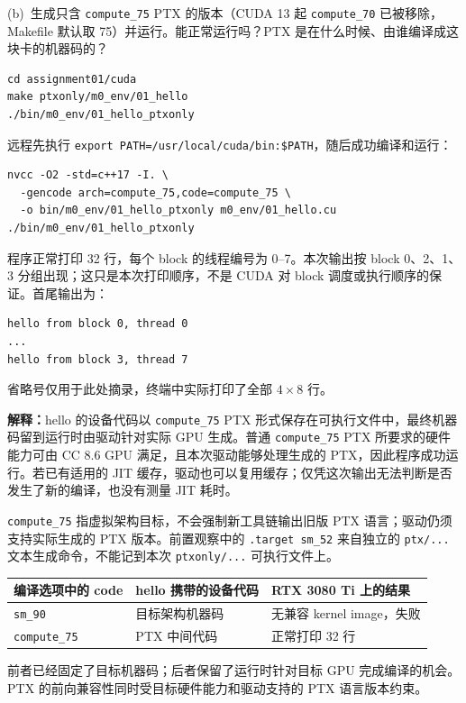 \documentclass[11pt,a4paper,fontset=none]{ctexart}
\begin{document}
(b)~生成只含 \texttt{compute\_75} PTX 的版本（CUDA 13 起 \texttt{compute\_70} 已被移除，Makefile 默认取 75）并运行。能正常运行吗？PTX 是在什么时候、由谁编译成这块卡的机器码的？

\begin{lstlisting}
cd assignment01/cuda
make ptxonly/m0_env/01_hello
./bin/m0_env/01_hello_ptxonly
\end{lstlisting}

\begin{tcolorbox}[title={8.2(b) 实验记录：只含低架构 PTX},breakable]
远程先执行 \texttt{export PATH=/usr/local/cuda/bin:\$PATH}，随后成功编译和运行：
\begin{lstlisting}
nvcc -O2 -std=c++17 -I. \
  -gencode arch=compute_75,code=compute_75 \
  -o bin/m0_env/01_hello_ptxonly m0_env/01_hello.cu
./bin/m0_env/01_hello_ptxonly
\end{lstlisting}
程序正常打印 32 行，每个 block 的线程编号为 0--7。本次输出按 block 0、2、1、3 分组出现；这只是本次打印顺序，不是 CUDA 对 block 调度或执行顺序的保证。首尾输出为：
\begin{lstlisting}
hello from block 0, thread 0
...
hello from block 3, thread 7
\end{lstlisting}
省略号仅用于此处摘录，终端中实际打印了全部 $4\times8$ 行。

\textbf{解释：}hello 的设备代码以 \texttt{compute\_75} PTX 形式保存在可执行文件中，最终机器码留到运行时由驱动针对实际 GPU 生成。普通 \texttt{compute\_75} PTX 所要求的硬件能力可由 CC 8.6 GPU 满足，且本次驱动能够处理生成的 PTX，因此程序成功运行。若已有适用的 JIT 缓存，驱动也可以复用缓存；仅凭这次输出无法判断是否发生了新的编译，也没有测量 JIT 耗时。

\texttt{compute\_75} 指虚拟架构目标，不会强制新工具链输出旧版 PTX 语言；驱动仍须支持实际生成的 PTX 版本。前置观察中的 \texttt{.target sm\_52} 来自独立的 \texttt{ptx/...} 文本生成命令，不能记到本次 \texttt{ptxonly/...} 可执行文件上。
\end{tcolorbox}

\begin{tcolorbox}[title={8.2 两次实验对照},breakable]
\begin{center}\small
\setlength{\tabcolsep}{5pt}
\begin{tabular}{@{}lll@{}}
\toprule
编译选项中的 code & hello 携带的设备代码 & RTX 3080 Ti 上的结果 \\
\midrule
\texttt{sm\_90} & 目标架构机器码 & 无兼容 kernel image，失败 \\
\texttt{compute\_75} & PTX 中间代码 & 正常打印 32 行 \\
\bottomrule
\end{tabular}
\end{center}
前者已经固定了目标机器码；后者保留了运行时针对目标 GPU 完成编译的机会。PTX 的前向兼容性同时受目标硬件能力和驱动支持的 PTX 语言版本约束。
\end{tcolorbox}
\end{document}
